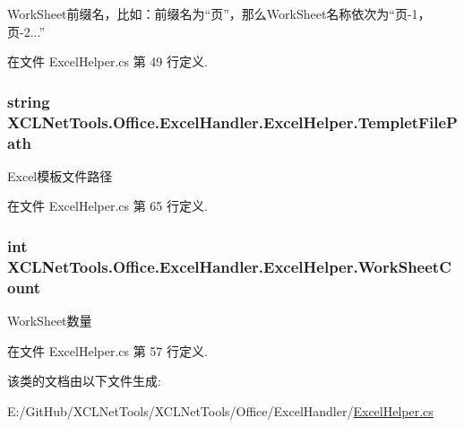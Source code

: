 Work\+Sheet前缀名，比如：前缀名为“页”，那么\+Work\+Sheet名称依次为“页-\/1，页-\/2...” 



在文件 Excel\+Helper.\+cs 第 49 行定义.

\subsubsection[{\texorpdfstring{Templet\+File\+Path}{TempletFilePath}}]{\setlength{\rightskip}{0pt plus 5cm}string X\+C\+L\+Net\+Tools.\+Office.\+Excel\+Handler.\+Excel\+Helper.\+Templet\+File\+Path\hspace{0.3cm}{\ttfamily [set]}}\hypertarget{class_x_c_l_net_tools_1_1_office_1_1_excel_handler_1_1_excel_helper_a5ea43ea5bce7424c7ad90335ddeb09bd}{}\label{class_x_c_l_net_tools_1_1_office_1_1_excel_handler_1_1_excel_helper_a5ea43ea5bce7424c7ad90335ddeb09bd}


Excel模板文件路径 



在文件 Excel\+Helper.\+cs 第 65 行定义.

\subsubsection[{\texorpdfstring{Work\+Sheet\+Count}{WorkSheetCount}}]{\setlength{\rightskip}{0pt plus 5cm}int X\+C\+L\+Net\+Tools.\+Office.\+Excel\+Handler.\+Excel\+Helper.\+Work\+Sheet\+Count\hspace{0.3cm}{\ttfamily [get]}}\hypertarget{class_x_c_l_net_tools_1_1_office_1_1_excel_handler_1_1_excel_helper_a2354740ddfdb8dbef974f91258c672e0}{}\label{class_x_c_l_net_tools_1_1_office_1_1_excel_handler_1_1_excel_helper_a2354740ddfdb8dbef974f91258c672e0}


Work\+Sheet数量 



在文件 Excel\+Helper.\+cs 第 57 行定义.



该类的文档由以下文件生成\+:\begin{DoxyCompactItemize}
\item 
E\+:/\+Git\+Hub/\+X\+C\+L\+Net\+Tools/\+X\+C\+L\+Net\+Tools/\+Office/\+Excel\+Handler/\hyperlink{_excel_helper_8cs}{Excel\+Helper.\+cs}\end{DoxyCompactItemize}
